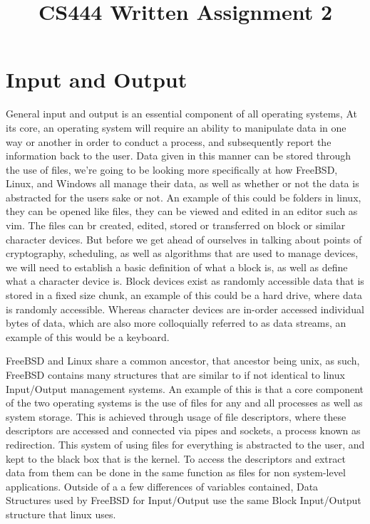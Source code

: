\documentclass[letterpaper,10pt,fleqn,draftclsnofoot,onecolumn]{IEEEtran}
\title{CS444 Written Assignment 2}
\author{\name}
\begin{document}
	\maketitle
	\hrulefill
	\section*{Input and Output}


General input and output is an essential component of all operating systems, At its core, an operating system will require an ability to manipulate data in one way or another in order to conduct a process, and subsequently report the information back to the user. Data given in this manner can be stored through the use of files, we're going to be looking more specifically at how FreeBSD, Linux, and Windows all manage their data, as well as whether or not the data is abstracted for the users sake or not. An example of this could be folders in linux, they can be opened like files, they can be viewed and edited in an editor such as vim. The files can br created, edited, stored or transferred on block or similar character devices. But before we get ahead of ourselves in talking about points of cryptography, scheduling, as well as algorithms that are used to manage devices, we will need to establish a basic definition of what a block is, as well as define what a character device is. Block devices exist as randomly accessible data that is stored in a fixed size chunk, an example of this could be a hard drive, where data is randomly accessible. Whereas character devices are in-order accessed individual bytes of data, which are also more colloquially referred to as data streams, an example of this would be a keyboard\cite{ROBERT}.

FreeBSD and Linux share a common ancestor, that ancestor being unix, as such, FreeBSD contains many structures that are similar to if not identical to linux Input/Output management systems\cite{BookOnFreeBsd}. An example of this is that a core component of the two operating systems is the use of files for any and all processes as well as system storage. This is achieved through usage of file descriptors, where these descriptors are accessed and connected via pipes and sockets, a process known as redirection. This system of using files for everything is abstracted to the user, and kept to the black box that is the kernel. To access the descriptors and extract data from them can be done in the same function as files for non system-level applications. Outside of a a few differences of variables contained, Data Structures used by FreeBSD for Input/Output use the same Block Input/Output structure that linux uses\cite{JosephKong}.
\end{document}
